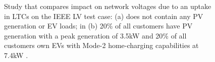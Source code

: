 \begin{figure}\centering
	\vspace{1mm}
	\caption{Study that compares impact on network voltages due to an uptake in LTCs on the IEEE LV test case: (a) does not contain any PV generation or EV loads; in (b) 20\% of all customers have PV generation with a peak generation of 3.5kW \cite{MongooseEnergy2015} and 20\% of all customers own EVs with Mode-2 home-charging capabilities at 7.4kW \cite{SustainableEnergyAuthorityofIreland2015}.}
	\label{ch-introduction:fig:lct-impact}
\end{figure}